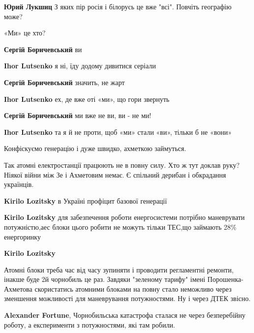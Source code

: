 \begin{itemize}
\begin{itemize}
\textbf{Юрий Лукшиц} З яких пір росія і білорусь це вже "всі". Повчіть географію може?

\end{itemize} %

«Ми» це хто?

\begin{itemize} %
\textbf{Сергій Боричевський} ви

\textbf{Ihor Lutsenko} я ні, їду додому дивитися серіали

\textbf{Сергій Боричевський} значить, не жарт

\textbf{Ihor Lutsenko} ех, де вже оті «ми», що гори звернуть

\textbf{Сергій Боричевський} ми вже не ви, ви - не ми!

\textbf{Ihor Lutsenko} та я й не проти, щоб «ми» стали «ви», тільки б не «вони»
\end{itemize} %

Конфіскуємо генерацію і дуже швидко, ахметкою займуться.


Так атомні електростанції працюють не в повну силу. Хто ж тут доклав руку?
Ніякої війни між Зе і Ахметовим немає. Є спільний дерибан і обкрадання
українців.

\begin{itemize} %
\textbf{Kirilo Lozitsky} в Україні профіцит базової генерації

\textbf{Kirilo Lozitsky} для забезпечення роботи енергосистеми потрібно маневрувати потужністю,аес блоки цього робити не можуть тільки ТЕС,що займають 28\% енергоринку

\textbf{Kirilo Lozitsky} 

Атомні блоки треба час від часу зупиняти і проводити регламентні ремонти,
інакше буде 2й чорнобиль це раз. Завдяки "зеленому тарифу" імені
Порошенка-Ахметова скористатись атомними блоками на повну стало неможливо через
зменшення можливості для маневрування потужностями. Ну і через ДТЕК звісно.


\textbf{Alexander Fortune}, Чорнобильська катастрофа сталася не через безперебійну роботу, а експерименти з потужностями, які там робили.
\end{itemize} %


\end{itemize}
